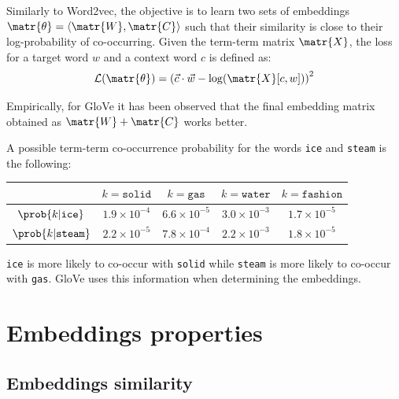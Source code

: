 \begin{description}
        Similarly to Word2vec, the objective is to learn two sets of embeddings $\matr{\theta} = \langle\matr{W}, \matr{C}\rangle$ such that their similarity is close to their log-probability of co-occurring. Given the term-term matrix $\matr{X}$, the loss for a target word $w$ and a context word $c$ is defined as:
        \[ \mathcal{L}(\matr{\theta}) = \left( \vec{c} \cdot \vec{w} - \log( \matr{X}[c, w] ) \right)^2 \]

        \begin{remark}
            Empirically, for GloVe it has been observed that the final embedding matrix obtained as $\matr{W} + \matr{C}$ works better.
        \end{remark}

        \begin{example}
            A possible term-term co-occurrence probability for the words \texttt{ice} and \texttt{steam} is the following:
            \begin{table}[H]
                \centering
                \footnotesize
                \begin{tabular}{ccccc}
                    \toprule
                    & $k=\texttt{solid}$ & $k=\texttt{gas}$ & $k=\texttt{water}$ & $k=\texttt{fashion}$ \\
                    \midrule
                    $\prob{k | \texttt{ice}}$ & $1.9 \times 10^{-4}$ & $6.6 \times 10^{-5}$ & $3.0 \times 10^{-3}$ & $1.7 \times 10^{-5}$ \\
                    $\prob{k | \texttt{steam}}$ & $2.2 \times 10^{-5}$ & $7.8 \times 10^{-4}$ & $2.2 \times 10^{-3}$ & $1.8 \times 10^{-5}$ \\
                    \bottomrule
                \end{tabular}
            \end{table}
            \texttt{ice} is more likely to co-occur with \texttt{solid} while \texttt{steam} is more likely to co-occur with \texttt{gas}. GloVe uses this information when determining the embeddings.
        \end{example}
\end{description}



\section{Embeddings properties}


\subsection{Embeddings similarity}

